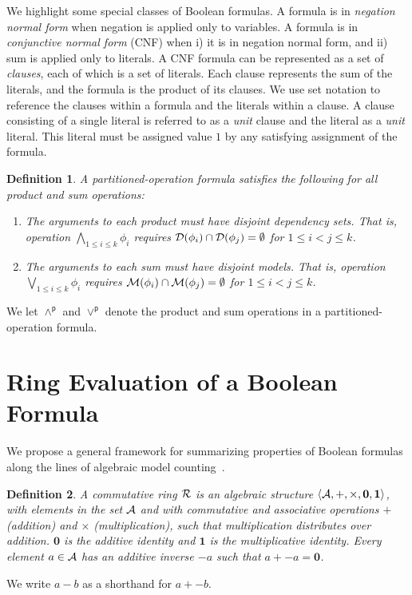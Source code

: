 \documentclass[twoside,11pt]{article}
\newcommand{\pand}{\mathbin{\land^\textsf{p}}}
\newcommand{\por}{\mathbin{\lor^\textsf{p}}}
\newcommand{\dependencyset}{{\cal D}}
\newcommand{\ring}{{\cal R}}
\newcommand{\dset}{{\cal A}}
\newcommand{\radd}{+}
\newcommand{\rmul}{\times}
\newcommand{\addident}{\textbf{0}}
\newcommand{\mulident}{\textbf{1}}
\newcommand{\modelset}{{\cal M}}
\newtheorem{dfn}{Definition}
\begin{document}
  We highlight some special classes of Boolean formulas.  A formula is
  in \emph{negation normal form} when negation is applied only to variables.  A
  formula is in \emph{conjunctive normal form} (CNF) when i) it is in
  negation normal form, and ii) sum is applied only to literals.  A CNF
  formula can be represented as a set of \emph{clauses}, each of which is a
  set of literals.  Each clause represents the sum of the
  literals, and the formula is the product of its clauses.  We use
  set notation to reference the clauses within a formula and the
  literals within a clause.  A clause consisting of a single literal is referred to as a \emph{unit} clause and the literal as a \emph{unit} literal.
This literal must be assigned value $1$ by any satisfying assignment of the formula.

\begin{dfn}
  \label{def:partitioned-operation-formula}
  A \emph{partitioned-operation formula}
 satisfies the following for all product and sum operations:
      \begin{enumerate}
      \item The arguments to each product must have disjoint dependency sets.  That is, operation
        $\bigwedge_{1 \leq i \leq k} \phi_i$ requires $\dependencyset(\phi_i) \cap \dependencyset(\phi_j) = \emptyset$ for $1 \leq i < j \leq k$.
      \item The arguments to each sum must have disjoint models.  That is, operation
        $\bigvee_{1 \leq i \leq k} \phi_i$ requires $\modelset(\phi_i) \cap \modelset(\phi_j) = \emptyset$ for $1 \leq i < j \leq k$.
      \end{enumerate}
\end{dfn}
     We let $\pand$ and $\por$ denote the product and sum operations in a partitioned-operation formula.

  \section{Ring Evaluation of a Boolean Formula}

We propose a general framework for summarizing properties of Boolean
formulas along the lines of algebraic model counting~\cite{kimmig:jal:2017}.

\begin{dfn}
  A \emph{commutative ring} $\ring$ is an algebraic structure
  $\langle \dset, \radd, \rmul, \addident, \mulident \rangle$,
  with elements in the set $\dset$ and with commutative and
  associative operations $\radd$ (addition) and $\rmul$ (multiplication),
  such that multiplication distributes
  over addition.  $\addident$ is the additive identity and $\mulident$ is
  the multiplicative identity.  Every element $a \in \dset$ has an
  \emph{additive inverse} $-a$ such that $a + -a = \addident$.
\label{def:ring}
\end{dfn}
We write $a - b$ as a shorthand for $a + -b$.
\end{document}
